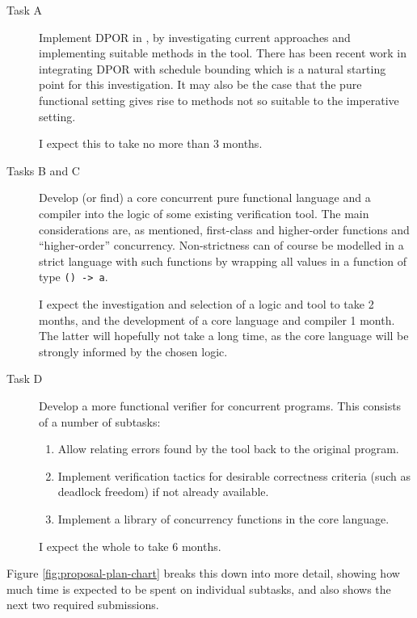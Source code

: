 \begin{description}
  \item[Task A] Implement DPOR in \dejafu{}, by investigating current
    approaches and implementing suitable methods in the tool. There
    has been recent work in integrating DPOR with schedule
    bounding\cite{bpor} which is a natural starting point for this
    investigation. It may also be the case that the pure functional
    setting gives rise to methods not so suitable to the imperative
    setting.

    I expect this to take no more than 3 months.

  \item[Tasks B and C] Develop (or find) a core concurrent pure
    functional language and a compiler into the logic of some existing
    verification tool. The main considerations are, as mentioned,
    first-class and higher-order functions and ``higher-order''
    concurrency. Non-strictness can of course be modelled in a strict
    language with such functions by wrapping all values in a function
    of type \verb|() -> a|.

    I expect the investigation and selection of a logic and tool
    to take 2 months, and the development of a core language and
    compiler 1 month. The latter will hopefully not take a long time,
    as the core language will be strongly informed by the chosen
    logic.

  \item[Task D] Develop a more functional verifier for concurrent
    programs. This consists of a number of subtasks:

    \begin{enumerate}
      \item Allow relating errors found by the tool back to the
        original program.
      \item Implement verification tactics for desirable correctness
        criteria (such as deadlock freedom) if not already available.
      \item Implement a library of concurrency functions in the core
        language.
    \end{enumerate}

    I expect the whole to take 6 months.
\end{description}

Figure \ref{fig:proposal-plan-chart} breaks this down into more
detail, showing how much time is expected to be spent on individual
subtasks, and also shows the next two required submissions.

